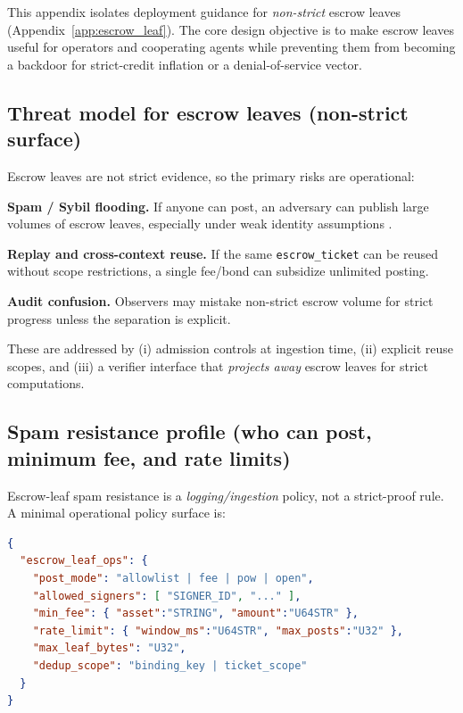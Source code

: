 \documentclass[11pt]{article}
\newcommand{\code}[1]{\texttt{#1}}
\newcommand{\1}{\mathbf{1}}
\theoremstyle{definition}
\theoremstyle{plain}
\begin{document}
This appendix isolates deployment guidance for \emph{non-strict} escrow leaves (Appendix~\ref{app:escrow_leaf}).
The core design objective is to make escrow leaves useful for operators and cooperating agents while preventing them from becoming a backdoor for strict-credit inflation or a denial-of-service vector.

\subsection{Threat model for escrow leaves (non-strict surface)}

Escrow leaves are not strict evidence, so the primary risks are operational:
\begin{tightitemize}
\item \textbf{Spam / Sybil flooding.} If anyone can post, an adversary can publish large volumes of escrow leaves, especially under weak identity assumptions \cite{DouceurSybil2002}.
\item \textbf{Replay and cross-context reuse.} If the same \code{escrow\_ticket} can be reused without scope restrictions, a single fee/bond can subsidize unlimited posting.
\item \textbf{Audit confusion.} Observers may mistake non-strict escrow volume for strict progress unless the separation is explicit.
\end{tightitemize}
These are addressed by (i) admission controls at ingestion time, (ii) explicit reuse scopes, and (iii) a verifier interface that \emph{projects away} escrow leaves for strict computations.

\subsection{Spam resistance profile (who can post, minimum fee, and rate limits)}

Escrow-leaf spam resistance is a \emph{logging/ingestion} policy, not a strict-proof rule.
A minimal operational policy surface is:

\begin{lstlisting}[language=json,caption={EscrowLeafOpsProfile (illustrative; non-strict).}]
{
  "escrow_leaf_ops": {
    "post_mode": "allowlist | fee | pow | open",
    "allowed_signers": [ "SIGNER_ID", "..." ],
    "min_fee": { "asset":"STRING", "amount":"U64STR" },
    "rate_limit": { "window_ms":"U64STR", "max_posts":"U32" },
    "max_leaf_bytes": "U32",
    "dedup_scope": "binding_key | ticket_scope"
  }
}
\end{lstlisting}
\end{document}
